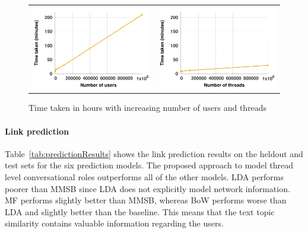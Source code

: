 \documentclass{sig-alternate}
\begin{document}
\begin{figure}
\centering
\hspace*{-1.5\baselineskip}
\begin{tabular}{l|l}
	\includegraphics[width=0.5\linewidth]{figs/scalabilityUsers.pdf}&
	\includegraphics[width=0.5\linewidth]{figs/scalabilityThreads.pdf}\\
\end{tabular}
\vspace*{-1\baselineskip}
\caption{\small{Time taken in hours with increasing number of users and threads}}
\label{fig:syntheticScalability}
\end{figure}
 
\vspace*{-0.5\baselineskip}
\paragraph{Link prediction} Table~\ref{tab:predictionResults} shows the link
prediction results on the heldout and test sets for the six prediction
models. The proposed approach to model thread 
level conversational roles outperforms
all of the other models. LDA performs poorer than MMSB since LDA does not 
explicitly model network information. MF performs slightly better than MMSB, 
whereas BoW performs worse than LDA and slightly better than the baseline. 
This means that the text topic similarity contains valuable information regarding 
the users.

\vspace*{-0.5\baselineskip}
\end{document}
